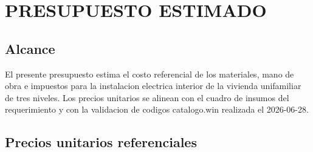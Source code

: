 \chapter{PRESUPUESTO ESTIMADO}

\section{Alcance}

El presente presupuesto estima el costo referencial de los materiales, mano de obra e impuestos para la instalacion electrica interior de la vivienda unifamiliar de tres niveles. Los precios unitarios se alinean con el cuadro de insumos del requerimiento y con la validacion de codigos catalogo.win realizada el 2026-06-28.

\section{Precios unitarios referenciales}


